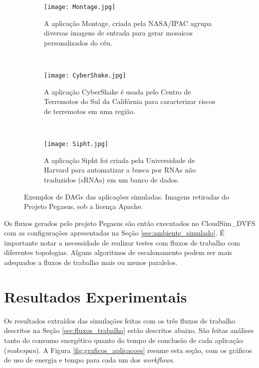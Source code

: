 \begin{figure}
        \centering
        \begin{subfigure}[b]{0.3\textwidth}
                \texttt{[image: Montage.jpg]}
                \caption{A aplicação Montage, criada pela NASA/IPAC agrupa
                diversas imagens de entrada para gerar mosaicos personalizados
                do céu.}
                \label{fig:montage}
        \end{subfigure}%
        ~ %
        \begin{subfigure}[b]{0.3\textwidth}
                \texttt{[image: CyberShake.jpg]}
                \caption{A aplicação CyberShake é usada pelo Centro de Terremotos
                do Sul da Califórnia para caracterizar riscos de terremotos em uma
                região.}
                \label{fig:cybershake}
        \end{subfigure}
        ~
        \begin{subfigure}[b]{0.3\textwidth}
                \texttt{[image: Sipht.jpg]}
                \caption{A aplicação Sipht foi criada pela Universidade de
                Harvard para automatizar a busca por RNAs não traduzidos (sRNAs)
                em um banco de dados.}
                \label{fig:sipht}
        \end{subfigure}%
        \caption{Exemplos de DAGs das aplicações simuladas. Imagens retiradas
        do Projeto Pegasus, sob a licença Apache.}
        \label{fig:dags_aplicacoes}
\end{figure}


Os fluxos gerados pelo projeto Pegasus são então executados no CloudSim\_DVFS
com as configurações apresentadas na Seção \ref{sec:ambiente_simulado}. É
importante notar a necessidade de realizar testes com fluxos de trabalho com
diferentes topologias. Alguns algoritmos de escalonamento podem ser mais
adequados a fluxos de trabalho mais ou menos paralelos.


\section{Resultados Experimentais}
\label{sec:resultados_experimentais}

Os resultados extraídos das simulações feitas com os três fluxos de trabalho
descritos na Seção \ref{sec:fluxos_trabalho} estão descritos abaixo. São feitas
análises tanto do consumo energético quanto do tempo de conclusão de cada
aplicação (\emph{makespan}). A Figura \ref{fig:graficos_aplicacoes} resume esta
seção, com os gráficos de uso de energia e tempo para cada um dos
\emph{workflows}.


